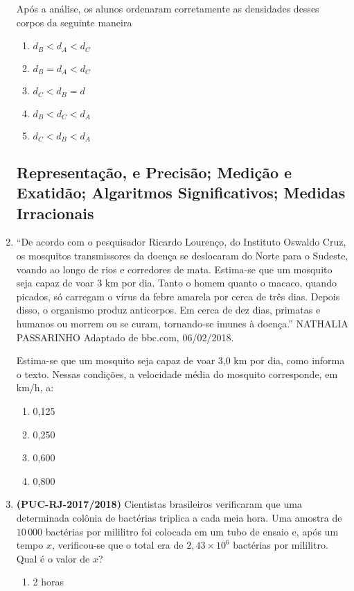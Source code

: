\begin{enumerate}
Após a análise, os alunos ordenaram corretamente as densidades desses corpos da seguinte maneira
\begin{enumerate}
\item {} 
$d_{B} < d_{A} < d_{C}$

\item {} 
$d_{B} = d_{A} < d_{C}$

\item {} 
$d_{C} < d_{B} = d_{}$

\item {} 
$d_{B} < d_{C} < d_{A}$

\item {} 
$d_{C} < d_{B} < d_{A}$

\end{enumerate}

\clearpage
\subsection{Representação, e Precisão; Medição e Exatidão; Algaritmos Significativos; Medidas Irracionais}

\item “De acordo com o pesquisador Ricardo Lourenço, do Instituto Oswaldo Cruz, os mosquitos transmissores da doença se deslocaram do Norte para o Sudeste, voando ao longo de rios e corredores de mata. Estima-se que um mosquito seja capaz de voar 3 km por dia. Tanto o homem quanto o macaco, quando picados, só carregam o vírus da febre amarela por cerca de três dias. Depois disso, o organismo produz anticorpos. Em cerca de dez dias, primatas e humanos ou morrem ou se curam, tornando-se imunes à doença.” NATHALIA PASSARINHO Adaptado de bbc.com, 06/02/2018.

Estima-se que um mosquito seja capaz de voar 3,0 km por dia, como informa o texto.
Nessas condições, a velocidade média do mosquito corresponde, em km/h, a:
\begin{enumerate}
\item {} 
0,125

\item {} 
0,250

\item {} 
0,600

\item {} 
0,800

\end{enumerate}

\item \textbf{(PUC-RJ-2017/2018)} Cientistas brasileiros verificaram que uma determinada colônia de bactérias triplica a cada meia hora. Uma amostra de \(10\,000\) bactérias por mililitro foi colocada em um tubo de ensaio e, após um tempo \(x\), verificou-se que o total era de \(2,43 \times 10^{6}\) bactérias por mililitro. Qual é o valor de \(x\)?
\begin{enumerate}
\item {} 
2 horas


\end{enumerate}
\end{enumerate}
